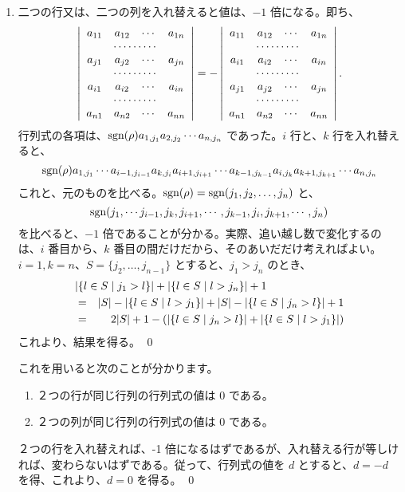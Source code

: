 \begin{enumerate}
\item 二つの行又は、二つの列を入れ替えると値は、$-1$ 倍になる。即ち、
$$\left|\begin{array}{cccc}a_{11} & a_{12} & \cdots & a_{1n} \\
\multicolumn{4}{c}{\cdots\cdots\cdots}\\
a_{j1} & a_{j2} & \cdots & a_{jn}\\
\multicolumn{4}{c}{\cdots\cdots\cdots}\\
a_{i1} & a_{i2} & \cdots & a_{in}\\
\multicolumn{4}{c}{\cdots\cdots\cdots}\\
a_{n1} & a_{n2} & \cdots & a_{nn}
\end{array}\right| = - 
\left|\begin{array}{cccc}a_{11} & a_{12} & \cdots & a_{1n} \\
\multicolumn{4}{c}{\cdots\cdots\cdots}\\
a_{i1} & a_{i2} & \cdots & a_{in}\\
\multicolumn{4}{c}{\cdots\cdots\cdots}\\
a_{j1} & a_{j2} & \cdots & a_{jn}\\
\multicolumn{4}{c}{\cdots\cdots\cdots}\\
a_{n1} & a_{n2} & \cdots & a_{nn}
\end{array}\right|.$$
	\proof
	行列式の各項は、$\mbox{{\rm sgn}}(\rho)a_{1,j_1}a_{2,j_2}\cdots a_{n,j_n}$ であった。$i$ 行と、$k$ 行を入れ替えると、
	$$\mbox{{\rm sgn}}(\rho)a_{1,j_1}\cdots a_{i-1,j_{i-1}}a_{k,j_i}a_{i+1,j_{i+1}}\cdots a_{k-1,j_{k-1}}a_{i,j_k}a_{k+1,j_{k+1}}\cdots a_{n,j_n}$$
	これと、元のものを比べる。$\mbox{{\rm sgn}}(\rho) = \mbox{{\rm sgn}}(j_1,j_2,\ldots, j_n)$ と、
	$$\mbox{{\rm sgn}}(j_1,\cdots j_{i-1}, j_k, j_{i+1},\cdots, j_{k-1},j_i,j_{k+1},\cdots, j_n)$$ 
	を比べると、$-1$ 倍であることが分かる。実際、追い越し数で変化するのは、$i$ 番目から、$k$ 番目の間だけだから、そのあいだだけ考えればよい。$i = 1, k=n$、$S = \{j_2,\ldots, j_{n-1}\}$ とすると、$j_1>j_n$ のとき、
	\begin{eqnarray*}
	\lefteqn{|\{l\in S\mid j_1>l\}| + |\{l\in S\mid l>j_{n}\}| + 1}\\
	& = & |S| - |\{l\in S\mid l>j_1\}| + |S| - |\{l\in S \mid j_{n}>l\}| + 1\\
	& = & 2|S| + 1 - (|\{l\in S \mid j_{n}>l\}| + |\{l\in S\mid l>j_1\}| )
	\end{eqnarray*}
	これより、結果を得る。
	\qed

これを用いると次のことが分かります。
	\begin{enumerate}
	\item ２つの行が同じ行列の行列式の値は $0$ である。
	\item ２つの列が同じ行列の行列式の値は $0$ である。
	\end{enumerate}
	\proof 
	２つの行を入れ替えれば、-1 倍になるはずであるが、入れ替える行が等しければ、変わらないはずである。従って、行列式の値を $d$ とすると、$d = -d$ を得、これより、$d = 0$ を得る。
	\qed
	

\end{enumerate}
